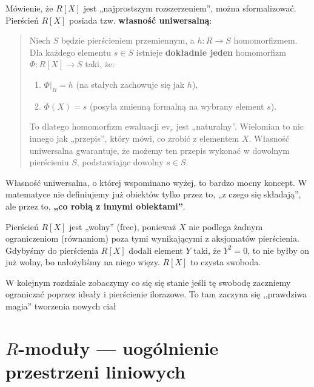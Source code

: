 \begin{definition}
Mówienie, że $R[X]$ jest „najprostszym rozszerzeniem”, można sformalizować. Pierścień $R[X]$ posiada tzw. \textbf{własność uniwersalną}:

\begin{quote}
Niech $S$ będzie pierścieniem przemiennym, a $h: R \to S$ homomorfizmem. Dla każdego elementu $s \in S$ istnieje \textbf{dokładnie jeden} homomorfizm $\Phi: R[X] \to S$ taki, że:
\begin{enumerate}[label=\roman*)]
    \item $\Phi|_R = h$ (na stałych zachowuje się jak $h$),
    \item $\Phi(X) = s$ (posyła zmienną formalną na wybrany element $s$).
\end{enumerate}

To dlatego homomorfizm ewaluacji $\text{ev}_r$ jest „naturalny”. Wielomian to nic innego jak „przepis”, który mówi, co zrobić z elementem $X$. Własność uniwersalna gwarantuje, że możemy ten przepis wykonać w dowolnym pierścieniu $S$, podstawiając dowolny $s \in S$.
\end{quote}
\end{definition}

\begin{remark}
Własność uniwersalna, o której wspominano wyżej, to bardzo mocny koncept. W matematyce nie definiujemy już obiektów tylko przez to, „z czego się składają”, ale przez to, \textbf{„co robią z innymi obiektami”}.

Pierścień $R[X]$ jest „wolny” (free), ponieważ $X$ nie podlega żadnym ograniczeniom (równaniom) poza tymi wynikającymi z aksjomatów pierścienia. Gdybyśmy do pierścienia $R[X]$ dodali element $Y$ taki, że $Y^2=0$, to nie byłby on już wolny, bo nałożyliśmy na niego więzy. $R[X]$ to czysta swoboda.

W kolejnym rozdziale zobaczymy co się się stanie jeśli tę swobodę zaczniemy ograniczać poprzez ideały i pierścienie ilorazowe. To tam zaczyna się ,,prawdziwa magia'' tworzenia nowych ciał
\end{remark} 


\section{$R$-moduły — uogólnienie przestrzeni liniowych}


